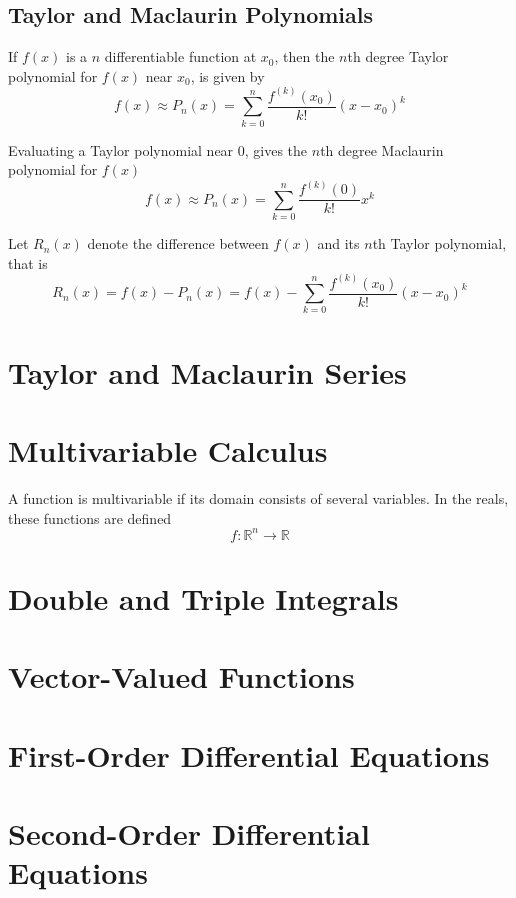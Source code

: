 \documentclass{article}
\begin{document}
\subsection{Taylor and Maclaurin Polynomials}
\begin{theorem}
    If $f(x)$ is a $n$ differentiable function at $x_0$, then the $n$th degree Taylor polynomial for $f(x)$ near $x_0$, is given by
    \begin{equation*}
        f(x) \approx P_n(x) = \sum_{k=0}^n \frac{f^{\left( k \right)}(x_0)}{k!} \left( x-x_0 \right)^k
    \end{equation*}
\end{theorem}
\begin{theorem}
    Evaluating a Taylor polynomial near $0$, gives the $n$th degree Maclaurin polynomial for $f(x)$
    \begin{equation*}
        f(x) \approx P_n(x) = \sum_{k=0}^n \frac{f^{\left( k \right)}(0)}{k!} x^k
    \end{equation*}
\end{theorem}
\begin{theorem}
    Let $R_n(x)$ denote the difference between $f(x)$ and its $n$th Taylor polynomial, that is 
    \begin{equation*}
        R_n(x) = f(x) - P_n(x) = f(x) - \sum_{k=0}^n \frac{f^{\left( k \right)}(x_0)}{k!} \left( x-x_0 \right)^k
    \end{equation*}
\end{theorem}
\newpage
\section{Taylor and Maclaurin Series}

\newpage
\section{Multivariable Calculus}
\begin{definition}
    A function is multivariable if its domain consists of several variables. In the reals, these functions are defined
    \begin{equation*}
        f:\mathbb{R}^n\to\mathbb{R}
    \end{equation*}
\end{definition}
\newpage
\section{Double and Triple Integrals}
\newpage
\section{Vector-Valued Functions}
\newpage
\section{First-Order Differential Equations}
\newpage
\section{Second-Order Differential Equations}
\newpage
\end{document}
